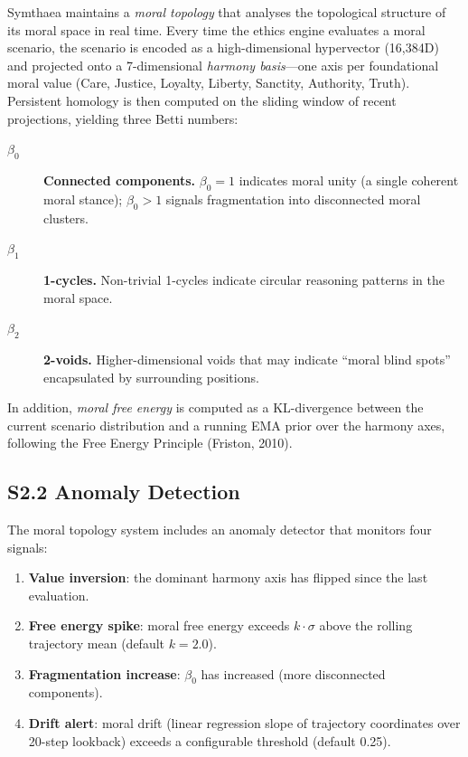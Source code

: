 \documentclass[10pt,landscape]{article}
\begin{document}
Symthaea maintains a \emph{moral topology} that analyses the topological structure of its moral space in real time.  Every time the ethics engine evaluates a moral scenario, the scenario is encoded as a high-dimensional hypervector (16,384D) and projected onto a 7-dimensional \emph{harmony basis}---one axis per foundational moral value (Care, Justice, Loyalty, Liberty, Sanctity, Authority, Truth).  Persistent homology is then computed on the sliding window of recent projections, yielding three Betti numbers:

\begin{description}
  \item[$\beta_0$] \textbf{Connected components.}  $\beta_0 = 1$ indicates moral unity (a single coherent moral stance); $\beta_0 > 1$ signals fragmentation into disconnected moral clusters.
  \item[$\beta_1$] \textbf{1-cycles.}  Non-trivial 1-cycles indicate circular reasoning patterns in the moral space.
  \item[$\beta_2$] \textbf{2-voids.}  Higher-dimensional voids that may indicate ``moral blind spots'' encapsulated by surrounding positions.
\end{description}

\noindent In addition, \emph{moral free energy} is computed as a KL-divergence between the current scenario distribution and a running EMA prior over the harmony axes, following the Free Energy Principle (Friston, 2010).

\subsection*{S2.2 Anomaly Detection}

The moral topology system includes an anomaly detector that monitors four signals:

\begin{enumerate}
  \item \textbf{Value inversion}: the dominant harmony axis has flipped since the last evaluation.
  \item \textbf{Free energy spike}: moral free energy exceeds $k \cdot \sigma$ above the rolling trajectory mean (default $k = 2.0$).
  \item \textbf{Fragmentation increase}: $\beta_0$ has increased (more disconnected components).
  \item \textbf{Drift alert}: moral drift (linear regression slope of trajectory coordinates over 20-step lookback) exceeds a configurable threshold (default 0.25).
\end{enumerate}
\end{document}
